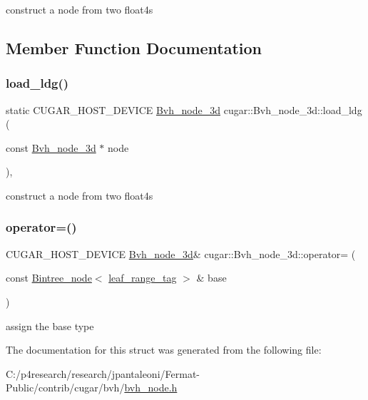 construct a node from two float4\textquotesingle{}s 

\subsection{Member Function Documentation}
\mbox{\label{structcugar_1_1_bvh__node__3d_a765171d7b76108e44d2ec4ff9684741c}} 
\subsubsection{\texorpdfstring{load\+\_\+ldg()}{load\_ldg()}}
{\footnotesize\ttfamily static C\+U\+G\+A\+R\+\_\+\+H\+O\+S\+T\+\_\+\+D\+E\+V\+I\+CE \hyperlink{structcugar_1_1_bvh__node__3d}{Bvh\+\_\+node\+\_\+3d} cugar\+::\+Bvh\+\_\+node\+\_\+3d\+::load\+\_\+ldg (\begin{DoxyParamCaption}\item[{const \hyperlink{structcugar_1_1_bvh__node__3d}{Bvh\+\_\+node\+\_\+3d} $\ast$}]{node }\end{DoxyParamCaption})\hspace{0.3cm}{\ttfamily [inline]}, {\ttfamily [static]}}

construct a node from two float4\textquotesingle{}s \mbox{\label{structcugar_1_1_bvh__node__3d_a23550a54c38a821438d5e7f34f863c21}} 
\subsubsection{\texorpdfstring{operator=()}{operator=()}}
{\footnotesize\ttfamily C\+U\+G\+A\+R\+\_\+\+H\+O\+S\+T\+\_\+\+D\+E\+V\+I\+CE \hyperlink{structcugar_1_1_bvh__node__3d}{Bvh\+\_\+node\+\_\+3d}\& cugar\+::\+Bvh\+\_\+node\+\_\+3d\+::operator= (\begin{DoxyParamCaption}\item[{const \hyperlink{structcugar_1_1_bintree__node}{Bintree\+\_\+node}$<$ \hyperlink{structcugar_1_1leaf__range__tag}{leaf\+\_\+range\+\_\+tag} $>$ \&}]{base }\end{DoxyParamCaption})\hspace{0.3cm}{\ttfamily [inline]}}

assign the base type 

The documentation for this struct was generated from the following file\+:\begin{DoxyCompactItemize}
\item 
C\+:/p4research/research/jpantaleoni/\+Fermat-\/\+Public/contrib/cugar/bvh/\hyperlink{bvh__node_8h}{bvh\+\_\+node.\+h}\end{DoxyCompactItemize}
